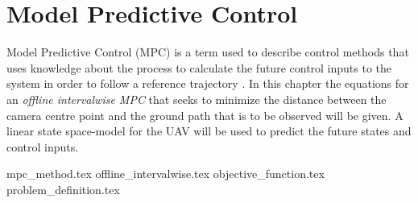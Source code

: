 \chapter[Model Predictive Control]{Model Predictive Control}
\label{ch:optimization}

Model Predictive Control (MPC) is a term used to describe control methods that uses knowledge about the process to calculate the future control inputs to the system in order to follow a reference trajectory \cite{mpcCAMACHO}. In this chapter the equations for an \textit{offline intervalwise MPC} that seeks to minimize the distance between the camera centre point and the ground path that is to be observed will be given. A linear state space-model for the UAV will be used to predict the future states and control inputs.


{mpc_method.tex}
{offline_intervalwise.tex}
{objective_function.tex}
{problem_definition.tex}